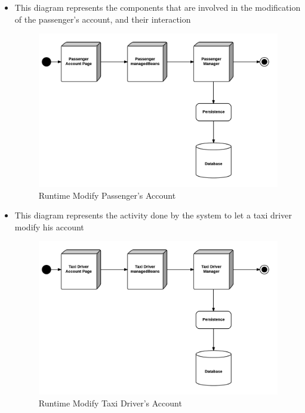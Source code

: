 \begin{itemize}
	\item This diagram represents the components that are involved in the modification of the passenger's account, and their interaction
	\begin{figure}[htbp]
	\centering
	\includegraphics[width=\textwidth]{cpt/img/RuntimeModifyPageView}
	\caption{Runtime Modify Passenger's Account}
	\end{figure}
	\clearpage
	
	\item This diagram represents the activity done by the system to let a taxi driver modify his account
	\begin{figure}[htbp]
	\centering
	\includegraphics[width=\textwidth]{cpt/img/RuntimeModifyPageTaxidriverView}
	\caption{Runtime Modify Taxi Driver's Account}
	\end{figure}
	\clearpage
	

\end{itemize}
